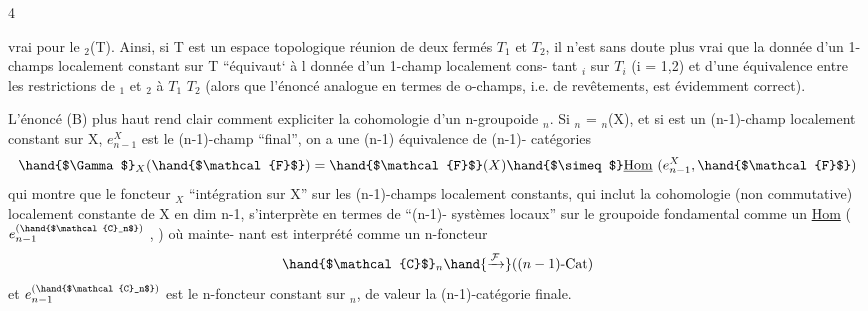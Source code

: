  \hfill 4

vrai pour le \hand{$\Pi$}$_2$(T). Ainsi, si T est un espace topologique réunion de
deux fermés $T_1$ et $T_2$, il n'est sans doute plus vrai que la donnée d'un 1-champs
localement constant sur T ``équivaut` à l donnée d'un 1-champ localement cons-%
tant $_i$ sur $T_i$ (i = 1,2) et d'une équivalence entre les restrictions
de $_1$ et $_2$ à $T_1$ \hand{$\cap$} $T_2$ (alors que l'énoncé analogue en termes de
o-champs, i.e. de revêtements, est évidemment correct).

  L'énoncé (B) plus haut rend clair comment expliciter la cohomologie
d'un n-groupoide $_n$. Si $_n$ = \hand{$\Pi$}$_n$(X), et si  est un (n-1)-champ
localement constant sur X, $e^X_{n-1}$ est le (n-1)-champ ``final'', on a une
(n-1) équivalence de (n-1)- catégories
\[
\hand{$\Gamma$}_X(\hand{$\mathcal{F}$}) = \hand{$\mathcal{F}$}(X) \hand{$\simeq$} \underline{\mathrm{Hom}}\ (e^X_{n-1}, \hand{$\mathcal{F}$})
\]
qui montre que le foncteur \hand{$\Gamma$}$_X$ ``intégration sur X'' sur les (n-1)-champs
localement constants, qui inclut la cohomologie (non commutative) localement
constante de X en dim \hand{$\leq$} n-1, s'interprète en termes de ``(n-1)- systèmes locaux''
sur le groupoide fondamental comme un \uline{Hom} ( $e_{n-1}^{(\hand{$\mathcal{C}_n$})}$ , ) où mainte-%
nant  est interprété comme un n-foncteur
\[
\hand{$\mathcal{C}$}_n \hand{\xrightarrow{\mathcal{F}}} ((n-1)\text{-Cat})
\]
et $e_{n-1}^{(\hand{$\mathcal{C}_n$})}$ est le n-foncteur constant sur $_n$, de valeur la (n-1)-catégorie
finale.

